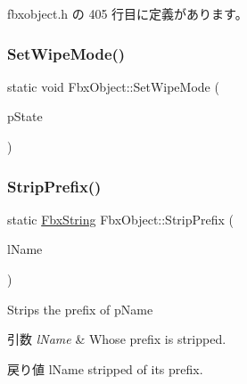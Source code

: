  fbxobject.\+h の 405 行目に定義があります。

\mbox{\label{class_fbx_object_adbd35588cd04556b1a7fc5ffdee8b417}} 
\subsubsection{\texorpdfstring{Set\+Wipe\+Mode()}{SetWipeMode()}}
{\footnotesize\ttfamily static void Fbx\+Object\+::\+Set\+Wipe\+Mode (\begin{DoxyParamCaption}\item[{bool}]{p\+State }\end{DoxyParamCaption})\hspace{0.3cm}{\ttfamily [static]}}

\mbox{\label{class_fbx_object_aef0a016a9b53593f537b68ba47b8dd6e}} 
\subsubsection{\texorpdfstring{Strip\+Prefix()}{StripPrefix()}\hspace{0.1cm}{\footnotesize\ttfamily [1/2]}}
{\footnotesize\ttfamily static \hyperlink{class_fbx_string}{Fbx\+String} Fbx\+Object\+::\+Strip\+Prefix (\begin{DoxyParamCaption}\item[{\hyperlink{class_fbx_string}{Fbx\+String} \&}]{l\+Name }\end{DoxyParamCaption})\hspace{0.3cm}{\ttfamily [static]}}

Strips the prefix of p\+Name 
\begin{DoxyParams}{引数}
{\em l\+Name} & Whose prefix is stripped. \\
\hline
\end{DoxyParams}
\begin{DoxyReturn}{戻り値}
l\+Name stripped of its prefix. 
\end{DoxyReturn}
\mbox{\label{class_fbx_object_a23b53eecb8b6b7d198496392dc987548}} 
